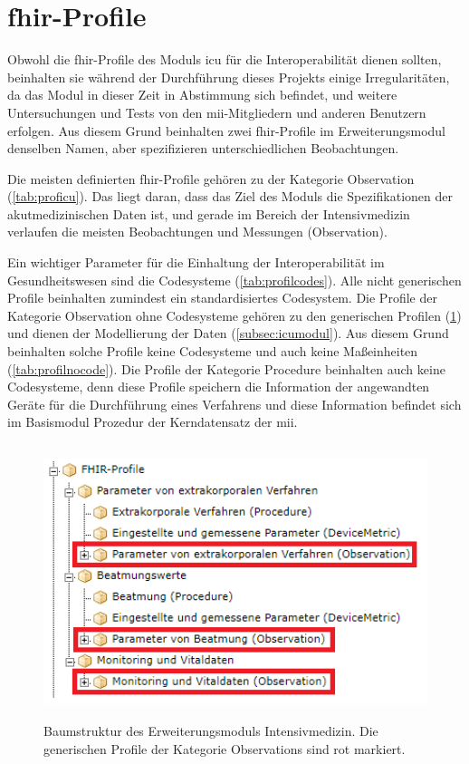 \section{\acs{fhir}-Profile} \label{sec:fhiricudisc}

Obwohl die \ac{fhir}-Profile des Moduls \glqq\ac{icu}\grqq{} für die Interoperabilität dienen sollten, beinhalten sie während der Durchführung dieses Projekts einige Irregularitäten, da das Modul in dieser Zeit in Abstimmung sich befindet, und weitere Untersuchungen und Tests von den \ac{mii}-Mitgliedern und anderen Benutzern erfolgen. Aus diesem Grund beinhalten zwei \ac{fhir}-Profile im Erweiterungsmodul denselben Namen, aber spezifizieren unterschiedlichen Beobachtungen.

Die meisten definierten \ac{fhir}-Profile gehören zu der Kategorie \glqq Observation\grqq{} (\ref{tab:proficu}). Das liegt daran, dass das Ziel des Moduls die Spezifikationen der akutmedizinischen Daten ist, und gerade im Bereich der Intensivmedizin verlaufen die meisten Beobachtungen und Messungen (\glqq Observation\grqq{}).

Ein wichtiger Parameter für die Einhaltung der Interoperabilität im Gesundheitswesen sind die Codesysteme (\ref{tab:profilcodes}). Alle nicht generischen Profile beinhalten zumindest ein standardisiertes Codesystem. Die Profile der Kategorie \glqq Observation\grqq{} ohne Codesysteme gehören zu den generischen Profilen (\ref{fig:icutreegenerics}) und dienen der Modellierung der Daten (\ref{subsec:icumodul}). Aus diesem Grund beinhalten solche Profile keine Codesysteme und auch keine Maßeinheiten (\ref{tab:profilnocode}). Die Profile der Kategorie \glqq Procedure\grqq{} beinhalten auch keine Codesysteme, denn diese Profile speichern die Information der angewandten Geräte für die Durchführung eines Verfahrens und diese Information befindet sich im Basismodul \glqq Prozedur\grqq{} der Kerndatensatz der \ac{mii}.

\begin{figure}[ht]
	\centering
	\includegraphics[height=8cm]{figures/icu_modul_tree_generics}
	\caption[Generische \glqq Observations\grqq{}]{Baumstruktur des Erweiterungsmoduls \glqq Intensivmedizin\grqq{}. Die generischen Profile der Kategorie \glqq Observations\grqq{} sind rot markiert.}
	\label{fig:icutreegenerics}
\end{figure}

